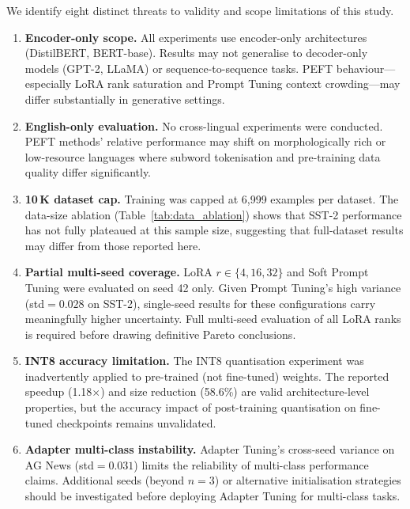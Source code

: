 \documentclass[conference]{IEEEtran}
\begin{document}
We identify eight distinct threats to validity and scope limitations of this study.

\begin{enumerate}
  \item \textbf{Encoder-only scope.} All experiments use encoder-only architectures (DistilBERT, BERT-base). Results may not generalise to decoder-only models (GPT-2, LLaMA) or sequence-to-sequence tasks. PEFT behaviour---especially LoRA rank saturation and Prompt Tuning context crowding---may differ substantially in generative settings.

  \item \textbf{English-only evaluation.} No cross-lingual experiments were conducted. PEFT methods' relative performance may shift on morphologically rich or low-resource languages where subword tokenisation and pre-training data quality differ significantly.

  \item \textbf{10\,K dataset cap.} Training was capped at 6{,}999 examples per dataset. The data-size ablation (Table~\ref{tab:data_ablation}) shows that SST-2 performance has not fully plateaued at this sample size, suggesting that full-dataset results may differ from those reported here.

  \item \textbf{Partial multi-seed coverage.} LoRA $r{\in}\{4,16,32\}$ and Soft Prompt Tuning were evaluated on seed 42 only. Given Prompt Tuning's high variance (std$=0.028$ on SST-2), single-seed results for these configurations carry meaningfully higher uncertainty. Full multi-seed evaluation of all LoRA ranks is required before drawing definitive Pareto conclusions.

  \item \textbf{INT8 accuracy limitation.} The INT8 quantisation experiment was inadvertently applied to pre-trained (not fine-tuned) weights. The reported speedup (1.18$\times$) and size reduction (58.6\%) are valid architecture-level properties, but the accuracy impact of post-training quantisation on fine-tuned checkpoints remains unvalidated.

  \item \textbf{Adapter multi-class instability.} Adapter Tuning's cross-seed variance on AG News (std$=0.031$) limits the reliability of multi-class performance claims. Additional seeds (beyond $n{=}3$) or alternative initialisation strategies should be investigated before deploying Adapter Tuning for multi-class tasks.


\end{enumerate}
\end{document}
